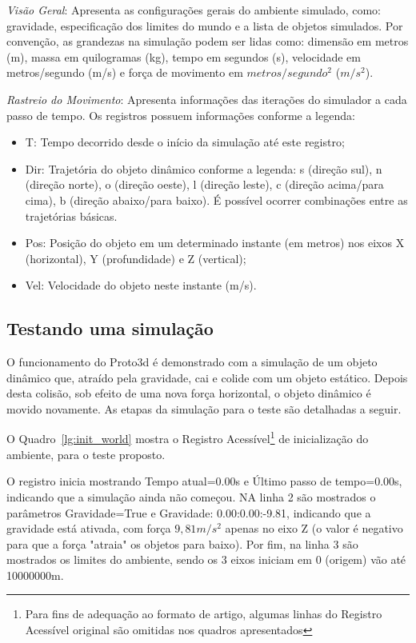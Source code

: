 \documentclass[12pt]{article}
\begin{document}
\emph{Visão Geral}: Apresenta as configurações gerais do ambiente simulado, como: gravidade, especificação dos limites do mundo e a lista de objetos simulados. Por convenção, as grandezas na simulação podem ser lidas como: dimensão em metros (m), massa em quilogramas (kg), tempo em segundos (s), velocidade em metros/segundo (m/s) e força de movimento em $metros/segundo^{2}$ ($m/s^{2}$).

\emph{Rastreio do Movimento}: Apresenta informações das iterações do simulador a cada passo de tempo. Os registros possuem informações conforme a legenda:

\begin{itemize}
	\item T: Tempo decorrido desde o início da simulação até este registro;
	\item Dir: Trajetória do objeto dinâmico conforme a legenda: s (direção sul), n (direção norte), o (direção oeste), l (direção leste), c (direção acima/para cima), b (direção abaixo/para baixo). É possível ocorrer combinações entre as trajetórias básicas. 
	\item Pos: Posição do objeto em um determinado instante (em metros) nos eixos X (horizontal), Y (profundidade) e Z (vertical);
	\item Vel: Velocidade do objeto neste instante (m/s).
\end{itemize}

\subsection{Testando uma simulação}
O funcionamento do Proto3d é demonstrado com a simulação de um objeto dinâmico que, atraído pela gravidade, cai e colide com um objeto estático. Depois desta colisão, sob efeito de uma nova força horizontal, o objeto dinâmico é movido novamente. As etapas da simulação para o teste são detalhadas a seguir. 

O Quadro~\ref{lg:init_world} mostra o Registro Acessível\footnote{Para fins de adequação ao formato de artigo, algumas linhas do Registro Acessível original são omitidas nos quadros apresentados} de inicialização do ambiente, para o teste proposto.

O registro inicia mostrando Tempo atual=0.00s e Último passo de tempo=0.00s, indicando que a simulação ainda não começou. NA linha 2 são mostrados o parâmetros Gravidade=True e Gravidade: 0.00:0.00:-9.81, indicando que a gravidade está ativada, com força $9,81 m/s^{2}$ apenas no eixo Z (o valor é negativo para que a força "atraia" os objetos para baixo). Por fim, na linha 3 são mostrados os limites do ambiente, sendo os 3 eixos iniciam em 0 (origem) vão até 10000000m.
\end{document}
